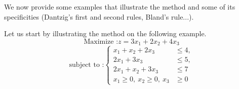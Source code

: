 We now provide some examples that illustrate the method and some of its specificities (Dantzig's first and second rules, Bland's rule...).


\begin{example}
    Let us start by illustrating the method on the following example.
    \[
        \text{Maximize :} z = 3x_1 + 2x_2 + 4x_3
    \]
    \[
        \text{subject to :}
        \left\{
        \begin{aligned}
        x_1 + x_2 + 2x_3 &\leqslant 4,\\
        2x_1 + 3x_3 &\leqslant 5,\\
        2x_1 + x_2 + 3x_3 &\leqslant 7 \\
        x_1 \geqslant 0,\ x_2 \geqslant 0,\ x_3 &\geqslant 0
        \end{aligned}
        \right.
    \]


\end{example}
